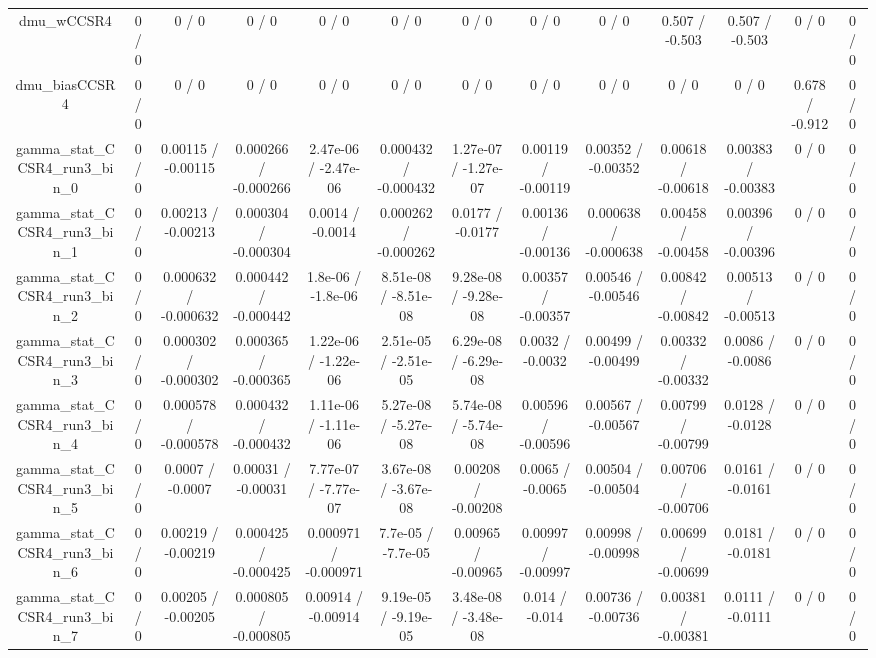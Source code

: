 \documentclass[10pt]{article}
\begin{document}
\begin{table}[htbp]
\begin{center}
\begin{tabular}{|c|c|c|c|c|c|c|c|c|c|c|c|c|}
  dmu_wCCSR4 & 0 / 0 & 0 / 0 & 0 / 0 & 0 / 0 & 0 / 0 & 0 / 0 & 0 / 0 & 0 / 0 & 0.507 / -0.503 & 0.507 / -0.503 & 0 / 0 & 0 / 0 \\ 
  dmu_biasCCSR4 & 0 / 0 & 0 / 0 & 0 / 0 & 0 / 0 & 0 / 0 & 0 / 0 & 0 / 0 & 0 / 0 & 0 / 0 & 0 / 0 & 0.678 / -0.912 & 0 / 0 \\ 
  gamma_stat_CCSR4_run3_bin_0 & 0 / 0 & 0.00115 / -0.00115 & 0.000266 / -0.000266 & 2.47e-06 / -2.47e-06 & 0.000432 / -0.000432 & 1.27e-07 / -1.27e-07 & 0.00119 / -0.00119 & 0.00352 / -0.00352 & 0.00618 / -0.00618 & 0.00383 / -0.00383 & 0 / 0 & 0 / 0 \\ 
  gamma_stat_CCSR4_run3_bin_1 & 0 / 0 & 0.00213 / -0.00213 & 0.000304 / -0.000304 & 0.0014 / -0.0014 & 0.000262 / -0.000262 & 0.0177 / -0.0177 & 0.00136 / -0.00136 & 0.000638 / -0.000638 & 0.00458 / -0.00458 & 0.00396 / -0.00396 & 0 / 0 & 0 / 0 \\ 
  gamma_stat_CCSR4_run3_bin_2 & 0 / 0 & 0.000632 / -0.000632 & 0.000442 / -0.000442 & 1.8e-06 / -1.8e-06 & 8.51e-08 / -8.51e-08 & 9.28e-08 / -9.28e-08 & 0.00357 / -0.00357 & 0.00546 / -0.00546 & 0.00842 / -0.00842 & 0.00513 / -0.00513 & 0 / 0 & 0 / 0 \\ 
  gamma_stat_CCSR4_run3_bin_3 & 0 / 0 & 0.000302 / -0.000302 & 0.000365 / -0.000365 & 1.22e-06 / -1.22e-06 & 2.51e-05 / -2.51e-05 & 6.29e-08 / -6.29e-08 & 0.0032 / -0.0032 & 0.00499 / -0.00499 & 0.00332 / -0.00332 & 0.0086 / -0.0086 & 0 / 0 & 0 / 0 \\ 
  gamma_stat_CCSR4_run3_bin_4 & 0 / 0 & 0.000578 / -0.000578 & 0.000432 / -0.000432 & 1.11e-06 / -1.11e-06 & 5.27e-08 / -5.27e-08 & 5.74e-08 / -5.74e-08 & 0.00596 / -0.00596 & 0.00567 / -0.00567 & 0.00799 / -0.00799 & 0.0128 / -0.0128 & 0 / 0 & 0 / 0 \\ 
  gamma_stat_CCSR4_run3_bin_5 & 0 / 0 & 0.0007 / -0.0007 & 0.00031 / -0.00031 & 7.77e-07 / -7.77e-07 & 3.67e-08 / -3.67e-08 & 0.00208 / -0.00208 & 0.0065 / -0.0065 & 0.00504 / -0.00504 & 0.00706 / -0.00706 & 0.0161 / -0.0161 & 0 / 0 & 0 / 0 \\ 
  gamma_stat_CCSR4_run3_bin_6 & 0 / 0 & 0.00219 / -0.00219 & 0.000425 / -0.000425 & 0.000971 / -0.000971 & 7.7e-05 / -7.7e-05 & 0.00965 / -0.00965 & 0.00997 / -0.00997 & 0.00998 / -0.00998 & 0.00699 / -0.00699 & 0.0181 / -0.0181 & 0 / 0 & 0 / 0 \\ 
  gamma_stat_CCSR4_run3_bin_7 & 0 / 0 & 0.00205 / -0.00205 & 0.000805 / -0.000805 & 0.00914 / -0.00914 & 9.19e-05 / -9.19e-05 & 3.48e-08 / -3.48e-08 & 0.014 / -0.014 & 0.00736 / -0.00736 & 0.00381 / -0.00381 & 0.0111 / -0.0111 & 0 / 0 & 0 / 0 \\ 

\end{tabular}
\end{center}
\end{table}
\end{document}
